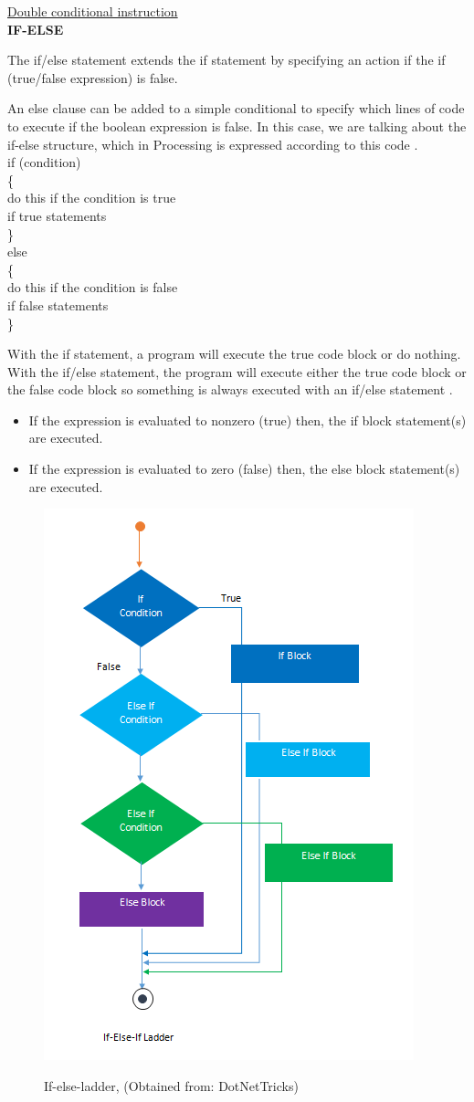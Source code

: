 \documentclass[11pt, letterpaper, english]{article}
\begin{document}
\underline{Double conditional instruction}
\\
\textbf{IF-ELSE}

\par{The if/else statement extends the if statement by specifying an action if the if (true/false expression) is false.}
\par{An else clause can be added to a simple conditional to specify which lines of code to execute if the boolean expression is false. In this case, we are talking about the if-else structure, which in Processing is expressed according to this code \cite{iscyp_2017}.}
\\
if (condition)\\
\{ \\
   do this if the condition is true\\
   if true statements\\
\} \\
else \\
\{ \\
   do this if the condition is false \\
   if false statements \\
\}
\par{With the if statement, a program will execute the true code block or do nothing. With the if/else statement, the program will execute either the true code block or the false code block so something is always executed with an if/else statement \cite{iscyp_2017}.}
\begin{itemize}
    \item If the expression is evaluated to nonzero (true) then, the if block statement(s) are executed.
    \item{If the expression is evaluated to zero (false) then, the else block statement(s) are executed.}
\end{itemize}
\begin{figure}
	    \centering
		\caption{If-else-ladder, (Obtained from: {DotNetTricks})}
		\includegraphics[width=0.2 \textwidth]{if-else-if ladder.png}
		\label{Imagen_If-else}
	\end{figure}
	
\end{document}
